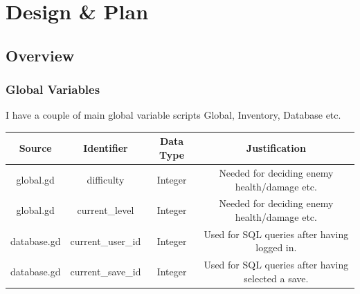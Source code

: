 \documentclass{article}
\begin{document}
\section{Design \& Plan}
        \subsection{Overview}
        \subsubsection{Global Variables}
        I have a couple of main global variable scripts Global, Inventory, Database etc.\\
        \begin{tabular}{|c|c|c|c|}
                \hline
                Source&Identifier&Data Type&Justification\\
                \hline
                global.gd&difficulty&Integer&Needed for deciding enemy health/damage etc.\\
                \hline
                global.gd&current\_level&Integer&Needed for deciding enemy health/damage etc.\\
                \hline
                database.gd&current\_user\_id&Integer&Used for SQL queries after having logged in.\\
                \hline
                database.gd&current\_save\_id&Integer&Used for SQL queries after having selected a save.\\
                \hline
        \end{tabular}
\end{document}
